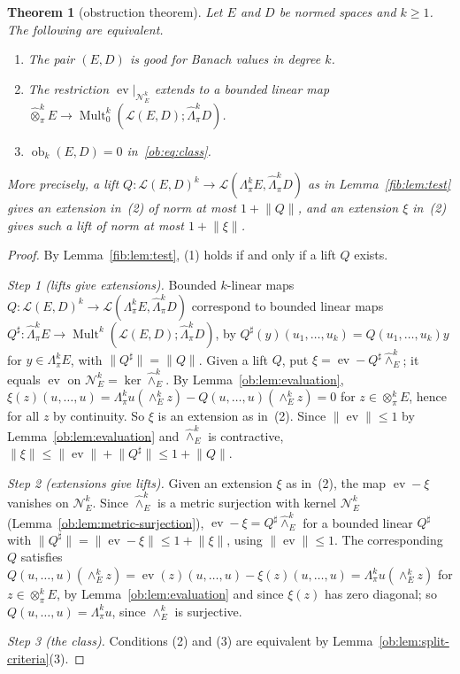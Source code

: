 \documentclass[11pt]{amsart}
\newtheorem{theorem}{Theorem}[section]
\theoremstyle{definition}
\theoremstyle{remark}
\numberwithin{equation}{section}
\newcommand{\cL}{\mathcal L}
\newcommand{\Mult}{\operatorname{Mult}}
\newcommand{\norm}[1]{\lVert #1\rVert}
\theoremstyle{plain}
\theoremstyle{definition}
\theoremstyle{plain}
\newcommand{\ev}{\operatorname{ev}}
\newcommand{\ob}{\operatorname{ob}}
\newcommand{\cN}{\mathcal N}
\begin{document}
\begin{theorem}[obstruction theorem]\label{ob:thm:obstruction}
Let $E$ and $D$ be normed spaces and $k\ge1$. The following are equivalent.
\begin{enumerate}
\item The pair $(E,D)$ is good for Banach values in degree $k$.
\item The restriction $\ev|_{\cN^k_E}$ extends to a bounded linear map
$\widehat\otimes^k_\pi E\to\Mult^k_0(\cL(E,D);\widehat\Lambda^k_\pi D)$.
\item $\ob_k(E,D)=0$ in~\eqref{ob:eq:class}.
\end{enumerate}
More precisely, a lift $Q\colon\cL(E,D)^k\to\cL(\Lambda^k_\pi E,\widehat\Lambda^k_\pi D)$ as in
Lemma~\ref{fib:lem:test} gives an extension in~(2) of norm at most $1+\norm Q$, and an extension $\xi$ in~(2) gives such a
lift of norm at most $1+\norm\xi$.
\end{theorem}

\begin{proof}
By Lemma~\ref{fib:lem:test}, (1) holds if and only if a lift $Q$ exists.

\emph{Step 1 (lifts give extensions).} Bounded $k$-linear maps
$Q\colon\cL(E,D)^k\to\cL(\Lambda^k_\pi E,\widehat\Lambda^k_\pi D)$ correspond to bounded linear maps
$Q^\sharp\colon\widehat\Lambda^k_\pi E\to\Mult^k(\cL(E,D);\widehat\Lambda^k_\pi D)$, by
$Q^\sharp(y)(u_1,\dots,u_k)=Q(u_1,\dots,u_k)y$ for $y\in\Lambda^k_\pi E$, with $\norm{Q^\sharp}=\norm Q$. Given a lift $Q$,
put $\xi=\ev-Q^\sharp\widehat\wedge^k_E$; it equals $\ev$ on $\cN^k_E=\ker\widehat\wedge^k_E$. By
Lemma~\ref{ob:lem:evaluation}, $\xi(z)(u,\dots,u)=\Lambda^k_\pi u(\wedge^k_Ez)-Q(u,\dots,u)(\wedge^k_Ez)=0$ for
$z\in\otimes^k_\pi E$, hence for all $z$ by continuity. So $\xi$ is an extension as in~(2). Since $\norm\ev\le1$ by
Lemma~\ref{ob:lem:evaluation} and $\widehat\wedge^k_E$ is contractive, $\norm\xi\le\norm\ev+\norm{Q^\sharp}\le1+\norm Q$.

\emph{Step 2 (extensions give lifts).} Given an extension $\xi$ as in~(2), the map $\ev-\xi$ vanishes on $\cN^k_E$. Since $\widehat\wedge^k_E$ is a
metric surjection with kernel $\cN^k_E$ (Lemma~\ref{ob:lem:metric-surjection}), $\ev-\xi=Q^\sharp\widehat\wedge^k_E$ for a
bounded linear $Q^\sharp$ with $\norm{Q^\sharp}=\norm{\ev-\xi}\le1+\norm\xi$, using $\norm\ev\le1$. The corresponding $Q$
satisfies $Q(u,\dots,u)(\wedge^k_Ez)=\ev(z)(u,\dots,u)-\xi(z)(u,\dots,u)=\Lambda^k_\pi u(\wedge^k_Ez)$ for
$z\in\otimes^k_\pi E$, by Lemma~\ref{ob:lem:evaluation} and since $\xi(z)$ has zero diagonal; so
$Q(u,\dots,u)=\Lambda^k_\pi u$, since $\wedge^k_E$ is surjective.

\emph{Step 3 (the class).} Conditions (2) and (3) are equivalent by Lemma~\ref{ob:lem:split-criteria}(3).
\end{proof}
\end{document}
